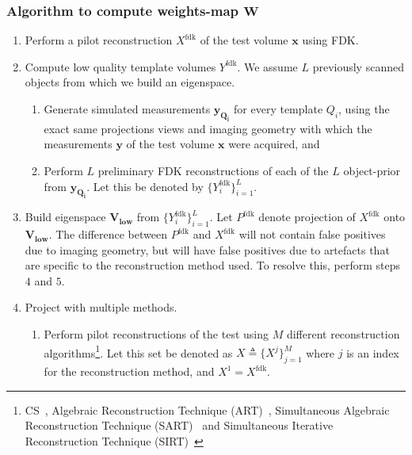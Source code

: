 \documentclass[journal]{IEEEtran}
\begin{document}
\subsubsection{\textbf{Algorithm to compute weights-map $\boldsymbol{W}$}}
\label{sec:thealgo}
\begin{enumerate}

\item Perform a pilot reconstruction $X^{\text{fdk}}$ of the
  test volume $\boldsymbol{x}$ using FDK.

\item Compute low quality template volumes $Y^\text{fdk}$. 
We assume $L$ previously scanned objects from which we build
an eigenspace. 
\vspace{-0.1cm}

  \begin{enumerate}
  \item Generate simulated measurements $\boldsymbol{y_{Q_i}}$ for every template $Q_i$, using the exact same projections views and imaging geometry with which the measurements $\boldsymbol{y}$ of the test volume $\boldsymbol{x}$ were acquired, and 
\item Perform $L$  preliminary FDK reconstructions of each of the $L$ object-prior from $\boldsymbol{y_{Q_i}}$.  Let this be denoted by $\{Y^{\text{fdk}}_i\}_{i=1}^L$.
  \end{enumerate}
\item Build eigenspace $\boldsymbol{V_{\text{low}}}$ from $\{Y^{\text{fdk}}_i\}_{i=1}^L$.  Let $P^{\text{fdk}}$ denote projection of $X^{\text{fdk}}$ onto $\boldsymbol{V_{\text{low}}}$. The difference between $P^{\text{fdk}}$ and $X^{\text{fdk}}$ will not contain false positives due to imaging geometry, but will have false positives due to artefacts that are specific to the reconstruction method used. To resolve this, perform steps $4$ and $5$.
\item Project with multiple methods.
  \begin{enumerate}
  \item Perform pilot reconstructions of the test using $M$ different
    reconstruction algorithms\footnote{CS~\cite{lasso}, Algebraic Reconstruction Technique (ART)~\cite{art},
     Simultaneous Algebraic Reconstruction Technique (SART)~\cite{sart} and  Simultaneous Iterative Reconstruction Technique (SIRT)~\cite{sirt}}. Let this set be denoted
    as $X \triangleq \{X^j\}_{j=1}^M$ where $j$ is an index for the
    reconstruction method, and $X^1 = X^{\text{fdk}}$. 


\end{enumerate}
\end{enumerate}
\end{document}
